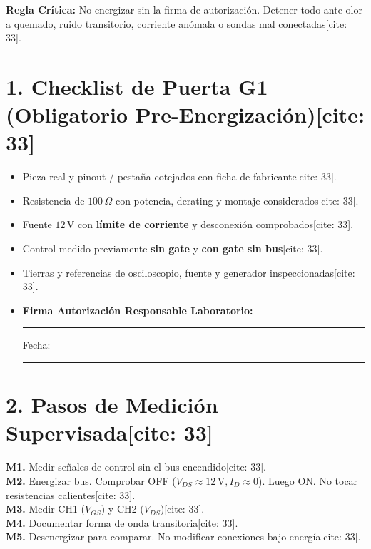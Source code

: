 \documentclass[11pt, a4paper]{article}
\begin{document}
\begin{tcolorbox}[colback=ucbblue!5, colframe=ucbblue, title=\textbf{Protocolo de Medición de Laboratorio E1 y Puerta G1[cite: 33]}]
    \textbf{Regla Crítica:} No energizar sin la firma de autorización. Detener todo ante olor a quemado, ruido transitorio, corriente anómala o sondas mal conectadas[cite: 33].
\end{tcolorbox}

\section*{1. Checklist de Puerta G1 (Obligatorio Pre-Energización)[cite: 33]}
\begin{itemize}
    \item[$\square$] Pieza real y pinout / pestaña cotejados con ficha de fabricante[cite: 33].
    \item[$\square$] Resistencia de $100\,\Omega$ con potencia, derating y montaje considerados[cite: 33].
    \item[$\square$] Fuente $12\,\text{V}$ con \textbf{límite de corriente} y desconexión comprobados[cite: 33].
    \item[$\square$] Control medido previamente \textbf{sin gate} y \textbf{con gate sin bus}[cite: 33].
    \item[$\square$] Tierras y referencias de osciloscopio, fuente y generador inspeccionadas[cite: 33].
    \item[$\square$] \textbf{Firma Autorización Responsable Laboratorio:} \rule{4cm}{0.15mm} \quad Fecha: \rule{2cm}{0.15mm}
\end{itemize}

\section*{2. Pasos de Medición Supervisada[cite: 33]}
\textbf{M1.} Medir señales de control sin el bus encendido[cite: 33]. \\
\textbf{M2.} Energizar bus. Comprobar OFF ($V_{DS} \approx 12\,\text{V}, I_D \approx 0$). Luego ON. No tocar resistencias calientes[cite: 33]. \\
\textbf{M3.} Medir CH1 ($V_{GS}$) y CH2 ($V_{DS}$)[cite: 33]. \\
\textbf{M4.} Documentar forma de onda transitoria[cite: 33]. \\
\textbf{M5.} Desenergizar para comparar. No modificar conexiones bajo energía[cite: 33].
\end{document}
